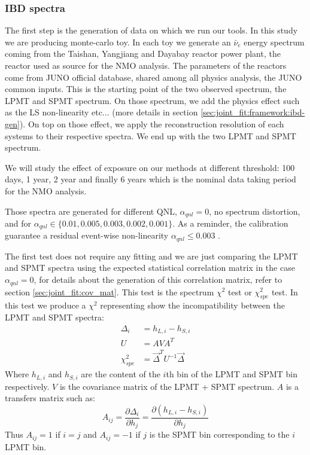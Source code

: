 \documentclass[../main.tex]{subfiles}
\begin{document}
\subsubsection{IBD spectra}

The first step is the generation of data on which we run our tools. In this study we are producing monte-carlo toy. In each toy we generate an $\bar{\nu}_e$ energy spectrum coming from the Taishan, Yangjiang and Dayabay reactor power plant, the reactor used as source for the NMO analysis. The parameters of the reactors come from JUNO official database, shared among all physics analysis, the JUNO common inputs. This is the starting point of the two observed spectrum, the LPMT and SPMT spectrum. On those spectrum, we add the physics effect such as the LS non-linearity etc... (more details in section \ref{sec:joint_fit:framework:ibd-gen}). On top on those effect, we apply the reconstruction resolution of each systems to their respective spectra. We end up with the two LPMT and SPMT spectrum.

We will study the effect of exposure on our methods at different threshold: 100 days, 1 year, 2 year and finally 6 years which is the nominal data taking period for the NMO analysis.

Those spectra are generated for different QNL, $\alpha_{qnl} = 0$, no spectrum distortion, and for $\alpha_{qnl} \in \{0.01, 0.005, 0.003, 0.002, 0.001\}$. As a reminder, the calibration guarantee a residual event-wise non-linearity $\alpha_{qnl} \leq 0.003$ \cite{juno_collaboration_calibration_2021}.

The first test does not require any fitting and we are just comparing the LPMT and SPMT spectra using the expected statistical correlation matrix in the case $\alpha_{qnl} = 0$, for details about the generation of this correlation matrix, refer to section \ref{sec:joint_fit:cov_mat}. This test is the spectrum $\chi^2$ test or $\chi^2_{spe}$ test. In this test we produce a $\chi^2$ representing show the incompatibility between the LPMT and SPMT spectra:
\begin{align}
  \Delta_i &= h_{L,i} - h_{S,i} \\
  U &= A V A^T \\
  \chi^2_{spe} &= \vec{\Delta}^T U^{-1} \vec{\Delta}
\end{align}
Where $h_{L,i}$ and $h_{S,i}$ are the content of the $i$th bin of the LPMT and SPMT bin respectively. $V$ is the covariance matrix of the LPMT + SPMT spectrum. $A$ is a transfers matrix such as:
\begin{equation}
  A_{ij} = \frac{\partial \Delta_i}{\partial h_j} = \frac{\partial(h_{L, i} - h_{S, i})}{\partial h_j}
\end{equation}
Thus $A_{ij} = 1$ if $i = j$ and $A_{ij} = -1$ if $j$ is the SPMT bin corresponding to the $i$ LPMT bin.
\end{document}
